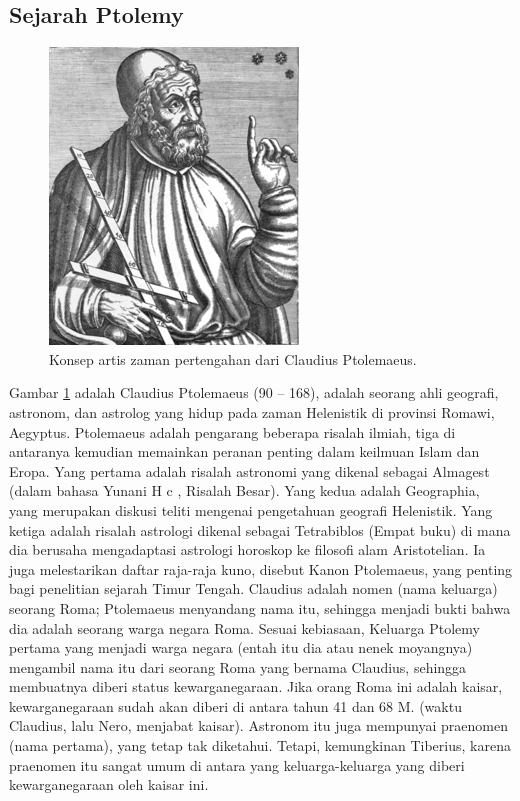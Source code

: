 \subsection{Sejarah Ptolemy}
	\begin{figure} [ht]
	\centerline{\includegraphics[width=.5\textwidth]{figures/Ptolemyporg}}
	\caption{Konsep artis zaman pertengahan dari Claudius Ptolemaeus.}
	\label{Ptolemyporg}
	\end{figure}
    Gambar \ref{Ptolemyporg} adalah Claudius Ptolemaeus (90 – 168), adalah seorang ahli geografi, astronom, dan astrolog yang hidup pada zaman Helenistik di provinsi Romawi, Aegyptus.
    Ptolemaeus adalah pengarang beberapa risalah ilmiah, tiga di antaranya kemudian memainkan peranan penting dalam keilmuan Islam dan Eropa. Yang pertama adalah risalah astronomi yang dikenal sebagai Almagest (dalam bahasa Yunani H \displaystyle \upsilon \varepsilon \gamma {}\lambda \eta \Sigma {} \nu \tau \alpha \xi \zeta c , Risalah Besar). Yang kedua adalah Geographia, yang merupakan diskusi teliti mengenai pengetahuan geografi Helenistik. Yang ketiga adalah risalah astrologi dikenal sebagai Tetrabiblos (Empat buku) di mana dia berusaha mengadaptasi astrologi horoskop ke filosofi alam Aristotelian. Ia juga melestarikan daftar raja-raja kuno, disebut Kanon Ptolemaeus, yang penting bagi penelitian sejarah Timur Tengah.
    Claudius adalah nomen (nama keluarga) seorang Roma; Ptolemaeus menyandang nama itu, sehingga menjadi bukti bahwa dia adalah seorang warga negara Roma. Sesuai kebiasaan, Keluarga Ptolemy pertama yang menjadi warga negara (entah itu dia atau nenek moyangnya) mengambil nama itu dari seorang Roma yang bernama Claudius, sehingga membuatnya diberi status kewarganegaraan. Jika orang Roma ini adalah kaisar, kewarganegaraan sudah akan diberi di antara tahun 41 dan 68 M. (waktu Claudius, lalu Nero, menjabat kaisar). Astronom itu juga mempunyai praenomen (nama pertama), yang tetap tak diketahui. Tetapi, kemungkinan Tiberius, karena praenomen itu sangat umum di antara yang keluarga-keluarga yang diberi kewarganegaraan oleh kaisar ini.
